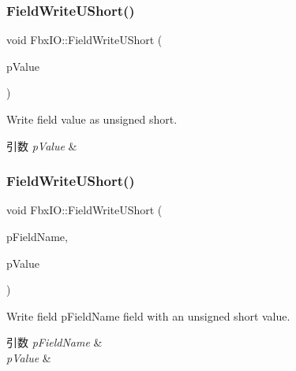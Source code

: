 \subsubsection{\texorpdfstring{Field\+Write\+U\+Short()}{FieldWriteUShort()}\hspace{0.1cm}{\footnotesize\ttfamily [1/2]}}
{\footnotesize\ttfamily void Fbx\+I\+O\+::\+Field\+Write\+U\+Short (\begin{DoxyParamCaption}\item[{\hyperlink{fbxtypes_8h_a321ef060885fc068fd77ac69a49f51d9}{Fbx\+U\+Short}}]{p\+Value }\end{DoxyParamCaption})}

Write field value as unsigned short. 
\begin{DoxyParams}{引数}
{\em p\+Value} & \\
\hline
\end{DoxyParams}
\mbox{\label{class_fbx_i_o_aaa6b02d1dec6c8cbe0f37758f18b00f2}} 
\subsubsection{\texorpdfstring{Field\+Write\+U\+Short()}{FieldWriteUShort()}\hspace{0.1cm}{\footnotesize\ttfamily [2/2]}}
{\footnotesize\ttfamily void Fbx\+I\+O\+::\+Field\+Write\+U\+Short (\begin{DoxyParamCaption}\item[{const char $\ast$}]{p\+Field\+Name,  }\item[{\hyperlink{fbxtypes_8h_a321ef060885fc068fd77ac69a49f51d9}{Fbx\+U\+Short}}]{p\+Value }\end{DoxyParamCaption})}

Write field p\+Field\+Name field with an unsigned short value. 
\begin{DoxyParams}{引数}
{\em p\+Field\+Name} & \\
\hline
{\em p\+Value} & \\
\hline
\end{DoxyParams}
\mbox{\label{class_fbx_i_o_ac058c3d63519dc9b2b992d678c23a759}} 
